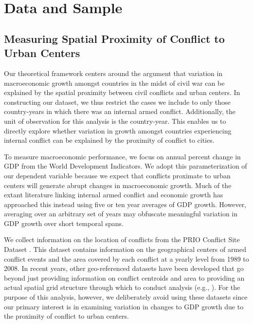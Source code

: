 \section{Data and Sample}
\label{empirics}

\subsection{Measuring Spatial Proximity of Conflict to Urban Centers}

Our theoretical framework centers around the argument that variation in macroeconomic growth amongst countries in the midst of civil war can be explained by the spatial proximity between civil conflicts and urban centers. In constructing our dataset, we thus restrict the cases we include to only those country-years in which there was an internal armed conflict. Additionally, the unit of observation for this analysis is the country-year. This enables us to directly explore whether variation in growth amongst countries experiencing internal conflict can be explained by the proximity of conflict to cities.

To measure macroeconomic performance, we focus on annual percent change in GDP from the World Development Indicators. We adopt this parameterization of our dependent variable because we expect that conflicts proximate to urban centers will generate abrupt changes in macroeconomic growth. Much of the extant literature linking internal armed conflict and economic growth has approached this instead using five or ten year averages of GDP growth. However, averaging over an arbitrary set of years may obfuscate meaningful variation in GDP growth over short temporal spans.

We collect information on the location of conflicts from the PRIO Conflict Site Dataset \citep{hallberg:2012}. This dataset contains information on the geographical centers of armed conflict events and the area covered by each conflict at a yearly level from 1989 to 2008. In recent years, other geo-referenced datasets have been developed that go beyond just providing information on conflict centroids and area to providing an actual spatial grid structure through which to conduct analysis (e.g., \citealt{tollefsen:etal:2012}). For the purpose of this analysis, however, we deliberately avoid using these datasets since our primary interest is in examining variation in changes to GDP growth due to the proximity of conflict to urban centers. 


